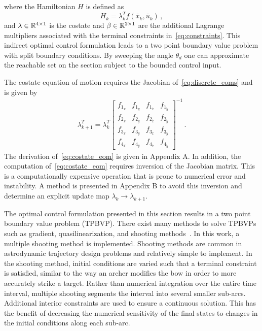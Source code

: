 \documentclass[letterpaper, paper,11pt]{AAS}		%
\begin{document}
where the Hamiltonian \(H\) is defined as
\begin{equation}
	H_k = \lambda_k^T f(\bar{x}_k, \bar{u}_k) \, ,
	\label{eq:hamiltonian_opt}
\end{equation}
and \(\lambda \in \mathbb{R}^{4 \times 1}\) is the costate and \(\beta \in \mathbb{R}^{2 \times 1} \) are the additional Lagrange multipliers associated with the terminal constraints in~\cref{eq:constraints}.
This indirect optimal control formulation leads to a two point boundary value problem with split boundary conditions. 
By sweeping the angle \( \theta_d \) one can approximate the reachable set on the \Poincare section subject to the bounded control input. 

The costate equation of motion requires the Jacobian of~\cref{eq:discrete_eoms} and is given by
\begin{align}\label{eq:costate_eom}
	\lambda_{k+1}^T = \lambda_k^T
	\begin{bmatrix} 
		f_{1_x} & f_{1_y} & f_{1_{\dot{x}}} & f_{1_{\dot{y}}} \\
		f_{2_x} & f_{2_y} & f_{2_{\dot{x}}} & f_{2_{\dot{y}}} \\
		f_{3_x} & f_{3_y} & f_{3_{\dot{x}}} & f_{3_{\dot{y}}} \\
		f_{4_x} & f_{4_y} & f_{4_{\dot{x}}} & f_{4_{\dot{y}}}
	\end{bmatrix} ^ {-1} \, .
\end{align}
The derivation of~\cref{eq:costate_eom} is given in Appendix A.
In addition, the computation of~\cref{eq:costate_eom} requires inversion of the Jacobian matrix.
This is a computationally expensive operation that is prone to numerical error and instability.
A method is presented in Appendix B to avoid this inversion and determine an explicit update map \( \lambda_k \to \lambda_{k+1} \).

The optimal control formulation presented in this section results in a two point boundary value problem (TPBVP). 
There exist many methods to solve TPBVPs such as gradient, quasilinearization, and shooting methods~\cite{bryson1975}.
In this work, a multiple shooting method is implemented.
Shooting methods are common in astrodynamic trajectory design problems and relatively simple to implement.
In the shooting method, initial conditions are varied such that a terminal constraint is satisfied, similar to the way an archer modifies the bow in order to more accurately strike a target. 
Rather than numerical integration over the entire time interval, multiple shooting segments the interval into several smaller sub-arcs.
Additional interior constraints are used to ensure a continuous solution.
This has the benefit of decreasing the numerical sensitivity of the final states to changes in the initial conditions along each sub-arc.
\end{document}
